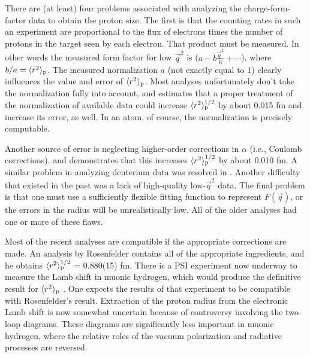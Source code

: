 \documentclass{svmult}
\begin{document}
There are (at least) four problems associated with analyzing the
charge-form-factor data to obtain the proton size.  The first is that the
counting rates in such an experiment are proportional to the flux of electrons
times the number of protons in the target seen by each electron.  That product
must be measured.  In other words the measured form factor for low $\vec{q}^2$ 
is ($a - b \frac{\vec{q}^2}{6} + \cdots$), where $b/a = \langle r^2 \rangle_{\rm
p}$. The measured normalization $a$ (not exactly equal to 1) clearly influences
the value and error of $\langle r^2 \rangle_{\rm p}$. Most analyses
unfortunately don't take the normalization fully into account, and \cite{norm}
estimates that a proper treatment of the normalization of available data could
increase $\langle r^2 \rangle_{\rm p}^{1/2}$ by about 0.015 fm and increase its
error, as well. In an atom, of course, the normalization is precisely 
computable.

Another source of error is neglecting higher-order corrections in $\alpha$
(i.e., Coulomb
corrections). and
\cite{Coulomb} demonstrates that this increases $\langle r^2 \rangle_{\rm
p}^{1/2}$ by about 0.010 fm. A similar problem in analyzing deuterium data was
resolved in \cite{ST}. Another difficulty that existed in the past was a lack of
high-quality low-$\vec{q}^2$ data.  The final problem is that one must use a
sufficiently flexible fitting function to represent $F ( \vec{q})$, or the
errors in the radius will be unrealistically low. All of the older analyses had
one or more of these flaws.

Most of the recent analyses\cite{Simon,Coulomb,fit} are compatible if the
appropriate corrections are made. An analysis by Rosenfelder\cite{Coulomb}
contains all of the appropriate ingredients, and he obtains $\langle r^2
\rangle_{\rm p}^{1/2}$ = 0.880(15) fm. There is a PSI experiment now underway to
measure the Lamb shift in muonic hydrogen,
which would produce the definitive result for $\langle r^2 \rangle_{\rm p}$
\cite{PSI,savely}. One expects the results of that experiment to be compatible
with Rosenfelder's result. Extraction of the proton radius\cite{2loop} from the
electronic Lamb shift is now somewhat
uncertain because of controversy involving the two-loop diagrams. These diagrams
are significantly less important in muonic hydrogen, where the relative roles of
the vacuum polarization and radiative processes are reversed.
\end{document}
